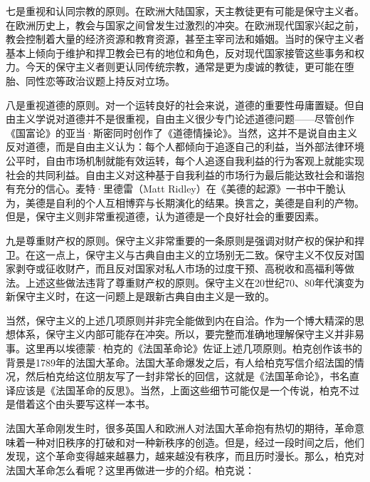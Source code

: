 七是重视和认同宗教的原则。在欧洲大陆国家，天主教徒更有可能是保守主义者。在欧洲历史上，教会与国家之间曾发生过激烈的冲突。在欧洲现代国家兴起之前，教会控制着大量的经济资源和教育资源，甚至主宰司法和婚姻。当时的保守主义者基本上倾向于维护和捍卫教会已有的地位和角色，反对现代国家接管这些事务和权力。今天的保守主义者则更认同传统宗教，通常是更为虔诚的教徒，更可能在堕胎、同性恋等政治议题上持反对立场。

八是重视道德的原则。对一个运转良好的社会来说，道德的重要性毋庸置疑。但自由主义学说对道德并不是很重视，自由主义很少专门论述道德问题——尽管创作《国富论》的亚当·斯密同时创作了《道德情操论》。当然，这并不是说自由主义反对道德，而是自由主义认为：每个人都倾向于追逐自己的利益，当外部法律环境公平时，自由市场机制就能有效运转，每个人追逐自我利益的行为客观上就能实现社会的共同利益。自由主义对这种基于自我利益的市场行为最后能达致社会和谐抱有充分的信心。麦特·里德雷（Matt Ridley）在《美德的起源》一书中干脆认为，美德是自利的个人互相博弈与长期演化的结果。换言之，美德是自利的产物。但是，保守主义则非常重视道德，认为道德是一个良好社会的重要因素。

九是尊重财产权的原则。保守主义非常重要的一条原则是强调对财产权的保护和捍卫。在这一点上，保守主义与古典自由主义的立场别无二致。保守主义不仅反对国家剥夺或征收财产，而且反对国家对私人市场的过度干预、高税收和高福利等做法。上述这些做法违背了尊重财产权的原则。保守主义在20世纪70、80年代演变为新保守主义时，在这一问题上是跟新古典自由主义是一致的。

当然，保守主义的上述几项原则并非完全能做到内在自洽。作为一个博大精深的思想体系，保守主义内部可能存在冲突。所以，要完整而准确地理解保守主义并非易事。这里再以埃德蒙·柏克的《法国革命论》佐证上述几项原则。柏克创作该书的背景是1789年的法国大革命。法国大革命爆发之后，有人给柏克写信介绍法国的情况，然后柏克给这位朋友写了一封非常长的回信，这就是《法国革命论》，书名直译应该是《法国革命的反思》。当然，上面这些细节可能仅是一个传说，柏克不过是借着这个由头要写这样一本书。

法国大革命刚发生时，很多英国人和欧洲人对法国大革命抱有热切的期待，革命意味着一种对旧秩序的打破和对一种新秩序的创造。但是，经过一段时间之后，他们发现，这个革命变得越来越暴力，越来越没有秩序，而且历时漫长。那么，柏克对法国大革命怎么看呢？这里再做进一步的介绍。柏克说：


